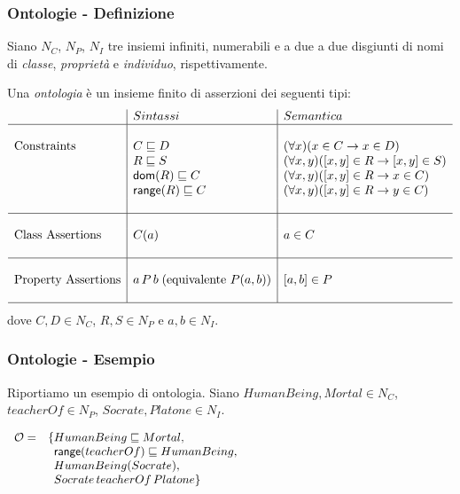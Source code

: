 \documentclass[8pt]{beamer}
\begin{document}
\newcommand{\CNames}{N_C}
\newcommand{\PNames}{N_P}
\newcommand{\INames}{N_I}
\newcommand{\VNames}{V}

\begin{frame}
\frametitle{Ontologie - Definizione}

Siano $\CNames$, $\PNames$, $\INames$ tre insiemi infiniti, numerabili e 
a due a due disgiunti di nomi di \emph{classe}, \emph{propriet\`a} e \emph{individuo},
rispettivamente.
\vspace{\baselineskip}

Una \emph{ontologia} \`e un insieme finito di asserzioni dei seguenti tipi:
\[
 \begin{array}{l|l|l}
  & Sintassi & Semantica \\
  \hline
  &&\\
  \mbox{Constraints} & C \sqsubseteq D & (\forall x)(x \in C \rightarrow x \in D) \\
  & R \sqsubseteq S & (\forall x, y)([x, y] \in R \rightarrow [x,y] \in S) \\
  & \mathsf{dom}(R) \sqsubseteq C & (\forall x, y)([x, y] \in R \rightarrow x \in C) \\
  & \mathsf{range}(R) \sqsubseteq C & (\forall x, y)([x, y] \in R \rightarrow y \in C) \\
  &&\\
  \hline
  &&\\
  \mbox{Class Assertions} & C(a) & a \in C\\
  &&\\
  \hline
  &&\\
  \mbox{Property Assertions} & a\,P\,b\;(\mbox{equivalente }P(a,b)) & [a,b] \in P \\
  &&\\
  \hline  
 \end{array}
\]
dove $C, D \in \CNames$, $R, S \in \PNames$ e $a, b \in \INames$.
\end{frame}

\newcommand{\Ont}{\mathcal{O}}
\newcommand{\Ontp}{\mathcal{O'}}

\begin{frame}
\frametitle{Ontologie - Esempio}
Riportiamo un esempio di ontologia. Siano $HumanBeing, Mortal \in \CNames$,
$teacherOf \in \PNames$, $Socrate, Platone \in \INames$.
\vspace{\baselineskip}

\[
 \begin{array}{clccl}
  \Ont  =  &\{HumanBeing \Issub Mortal, & &\phantom{\Ontp =} & \phantom{\{Mortal(Socrate), }\\
  &\phantom{\{}\range(teacherOf) \Issub HumanBeing, & \phantom{\Longrightarrow} && \phantom{\{HumanBeing(Platone)}\\
  &\phantom{\{}HumanBeing(Socrate), &&&\phantom{\{Mortal(Platone) \}}\\
  &\phantom{\{}Socrate\,teacherOf\,Platone \}\\
 \end{array}
\]
\end{frame}
\end{document}
